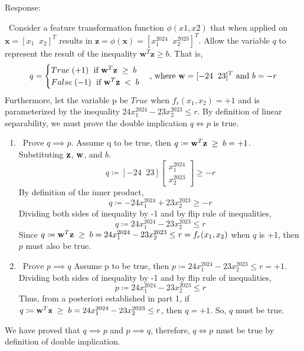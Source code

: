 \begin{flushleft}
Response:
\end{flushleft}
\begin{paragraph}
	~Consider a feature transformation function $\phi(x1, x2)$ that when applied on $\textbf{x} = [x_1 \;\; x_2]^T$ results in $\textbf{z} = \phi(\textbf{x}) = [x_1^{2024} \;\; x_2^{2023}]^T$. Allow the variable $q$ to represent the result of the inequality $\textbf{w}^T \textbf{z} \geq b$. That is,
	\begin{equation*}
	q = \begin{cases} 
		True \; (+1) \; \text{ if } {\bf w}^T {\bf z} \; \geq \; b \\
		False \; (-1) \; \text{ if } {\bf w}^T {\bf z} \; < \; b
		\end{cases} \text{, where } {\bf w} = [-24 \;\; 23]^T \text{ and } b = -r
	\end{equation*}
	Furthermore, let the variable p be $True$ when $f_r(x_1, x_2) = +1$ and is parameterized by the inequality $24x_1^{2024} - 23x_2^{2023} \leq r$. By definition of linear separability, we must prove the double implication $q \iff p$ is true.
	\begin{enumerate}
		\item ~$\text{Prove } q \implies p$. \newline
		Assume q to be true, then $q \coloneqq {\bf w}^T {\bf z} \; \geq \; b = +1$.\\
		
		Substituting ${\bf z}$, ${\bf w}$, and $b$. $$q \coloneqq [-24 \;\; 23] \begin{bmatrix}x_1^{2024} \\ x_2^{2023}\end{bmatrix} \geq -r$$
		By definition of the inner product,
			$$q \coloneqq -24x_1^{2024} + 23x_2^{2023} \geq -r$$
		Dividing both sides of inequality by -1 and by flip rule of inequalities,
			$$q \coloneqq 24x_1^{2024} - 23x_2^{2023} \leq r$$
		Since $q \coloneqq {\bf w}^T {\bf z} \; \geq \; b = 24x_1^{2024} - 23x_2^{2023} \leq r = f_r(x_1, x_2)$ when $q$ is +1, then $p$ must also be true. 
		
		\item ~$\text{Prove } p \implies q$ \newline
		Assume p to be true, then $p \coloneqq 24x_1^{2024} - 23x_2^{2023} \leq r = +1$.
		Dividing both sides of inequality by -1 and by flip rule of inequalities,
			$$p \coloneqq 24x_1^{2024} - 23x_2^{2023} \leq r$$
		Thus, from a posteriori established in part 1, if $q \coloneqq {\bf w}^T {\bf z} \; \geq \; b = 24x_1^{2024} - 23x_2^{2023} \leq r$, then $q = +1$. So, $q$ must be true.
	\end{enumerate}
	We have proved that $q \implies p$ and $p \implies q$, therefore, $q \iff p$ must be true by definition of double implication. 
\end{paragraph}


